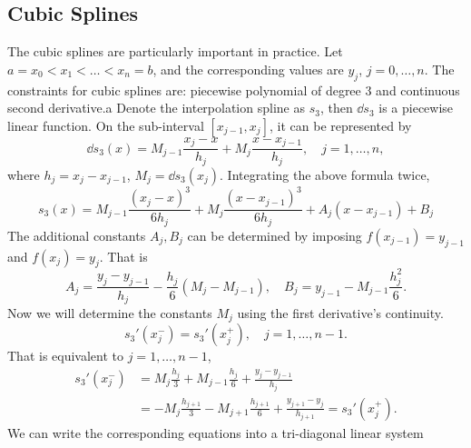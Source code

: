 \subsection{Cubic Splines}
The cubic splines are particularly important in practice. Let $a = x_0 < x_1 <\dots < x_n = b$, and the corresponding values are $y_j$, $j = 0, \dots, n$. The constraints for cubic splines are: piecewise polynomial of degree 3 and continuous second derivative.a Denote the interpolation spline as $s_3$, then $\dd{s_3}$ is a piecewise linear function. On the sub-interval $[x_{j-1}, x_j]$, it can be represented by 
\begin{equation}
    \dd{s_3}(x) = M_{j-1} \frac{x_j - x}{h_j} + M_j \frac{x - x_{j-1}}{h_j},\quad j = 1,\dots, n,
\end{equation}
where $h_j = x_j - x_{j-1}$, $M_j = \dd{s_3}(x_j)$. Integrating the above formula twice, 
\begin{equation}
    s_3(x) = M_{j-1} \frac{(x_j - x)^3}{6 h_j} + M_j \frac{(x - x_{j-1})^3}{6h_j} + A_j (x - x_{j-1}) + B_j
\end{equation}
The additional constants $A_j, B_j$ can be determined by imposing $f(x_{j-1}) = y_{j-1}$ and $f(x_j) = y_j$. That is 
\begin{equation}
    A_j = \frac{y_j - y_{j-1}}{h_j} - \frac{h_j}{6}(M_j - M_{j-1}),\quad 
    B_j = y_{j-1}-  M_{j-1} \frac{h_j^2}{6}.
\end{equation}
Now we will determine the constants $M_j$ using the first derivative's continuity. 
\begin{equation}
    s_3'(x_{j}^{-})  = s_3'(x_j^{+}), \quad j = 1,\dots, n-1.
\end{equation}
That is equivalent to $j=1,\dots, n-1$, 
\begin{equation}
    \begin{aligned}
        s_3'(x_{j}^{-})  &= M_j\frac{h_j}{3} + M_{j-1}\frac{h_{j}}{6} + \frac{y_j - y_{j-1}}{h_j}  \\
        &= -M_j \frac{h_{j+1}}{3}  - M_{j+1}\frac{h_{j+1}}{6} + \frac{y_{j+1} - y_j}{h_{j+1}} = s_3'(x_j^{+}). 
    \end{aligned}
\end{equation}
We can write the corresponding equations into a tri-diagonal linear system 
